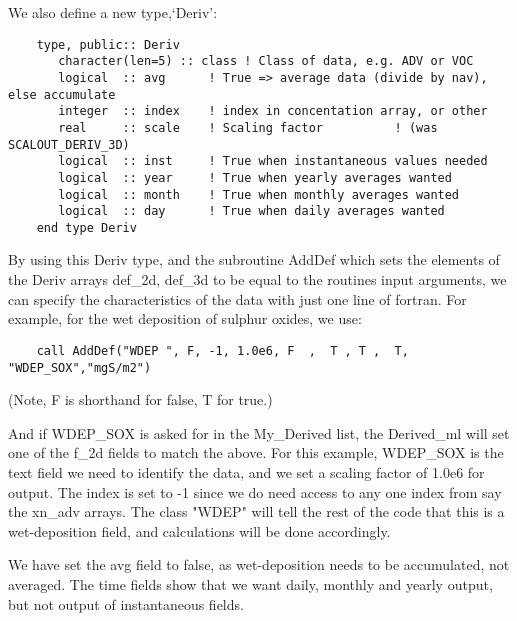    We also define a new type,`Deriv':

  \begin{small}\begin{verbatim}
    type, public:: Deriv
       character(len=5) :: class ! Class of data, e.g. ADV or VOC
       logical  :: avg      ! True => average data (divide by nav), else accumulate
       integer  :: index    ! index in concentation array, or other
       real     :: scale    ! Scaling factor          ! (was SCALOUT_DERIV_3D)
       logical  :: inst     ! True when instantaneous values needed
       logical  :: year     ! True when yearly averages wanted
       logical  :: month    ! True when monthly averages wanted
       logical  :: day      ! True when daily averages wanted
    end type Deriv
  \end{verbatim}
  \end{small}


  By using this Deriv type, and the subroutine AddDef which sets the elements of the
  Deriv arrays
  def\_2d, def\_3d to be equal to the routines input arguments, we can specify the characteristics of the data
  with just one line of fortran. For example, for the wet deposition of
  sulphur oxides, we use:


  \begin{small}
\begin{verbatim}
    call AddDef("WDEP ", F, -1, 1.0e6, F  ,  T , T ,  T, "WDEP_SOX","mgS/m2")
  \end{verbatim}
  \end{small}

  (Note, F is shorthand for false, T for true.)\\
  \bigskip


 \noindent
  And if WDEP\_SOX is asked for in the My\_Derived list, the Derived\_ml will
  set one of the f\_2d fields to match the above.
  For this example, WDEP\_SOX is the text field we need to identify the
  data, and we set a scaling factor of 1.0e6 for output. The index
  is set to -1 since we do need access to any one index from say 
  the xn\_adv arrays.
   The class
  "WDEP" will tell the rest of the code that this is a wet-deposition field,
   and  calculations will be done accordingly. 

   We have set the avg field to false, as wet-deposition needs to be accumulated,
   not averaged. The time fields show that we want daily, monthly and yearly
   output, but not output of instantaneous fields.


